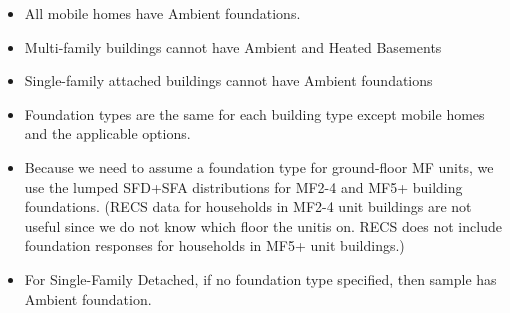 \begin{itemize}
\item All mobile homes have Ambient foundations.
\item Multi-family buildings cannot have Ambient and Heated Basements
\item Single-family attached buildings cannot have Ambient foundations
\item Foundation types are the same for each building type except mobile homes and the applicable options.
\item Because we need to assume a foundation type for ground-floor MF units, we use the lumped SFD+SFA distributions for MF2-4 and MF5+ building foundations. (RECS data for households in MF2-4 unit buildings are not useful since we do not know which floor the unitis on. RECS does not include foundation responses for households in MF5+ unit buildings.)
\item For Single-Family Detached, if no foundation type specified, then sample has Ambient foundation.
\end{itemize}
